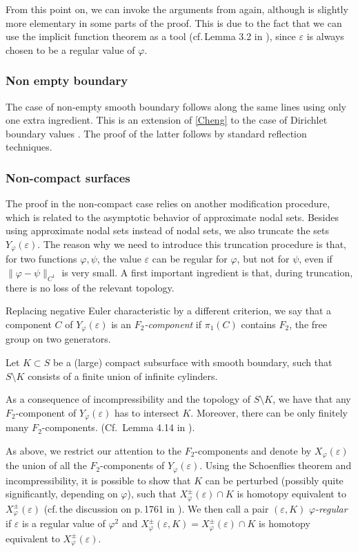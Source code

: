 \documentclass[a4paper,11pt]{amsart}
\numberwithin{equation}{section}
\theoremstyle{definition}
\def\ve{\varepsilon}
\begin{document}
From this point on, we can invoke the arguments from \cite{OR} again, although \cite{BMM1} is slightly more elementary in some parts of the proof.
This is due to the fact that we can use the implicit function theorem as a tool (cf.\,Lemma 3.2 in \cite{BMM1}), since $\ve$ is always chosen to be a regular value of $\varphi$. 

\subsubsection{Non empty boundary}
The case of non-empty smooth boundary follows along the same lines using only one extra ingredient.
This is an extension of \cref{Cheng} to the case of Dirichlet boundary values \cite[Theorem 1.7]{BMM2}.
The proof of the latter follows by standard reflection techniques.

\subsubsection{Non-compact surfaces}
The proof in the non-compact case relies on another modification procedure, which is related to the asymptotic behavior of approximate nodal sets.
Besides using approximate nodal sets instead of nodal sets, we also truncate the sets $Y_\varphi(\ve)$.
The reason why we need to introduce this truncation procedure is that, for two functions  $\varphi,\psi$, the value $\ve$ can be regular for $\varphi$, but not for $\psi$, even if $\| \varphi - \psi\|_{C^1}$ is very small.
A first important ingredient is that, during truncation, there is no loss of the relevant topology.

Replacing negative Euler characteristic by a different criterion,
we say that a component $C$ of $Y_\varphi(\ve)$ is an \emph{$F_2$-component}
if $\pi_1(C)$ contains $F_2$, the free group on two generators.

Let $K \subset S$ be a (large) compact subsurface with smooth boundary, such that $S \setminus K$ consists of a finite union of infinite cylinders.

As a consequence of incompressibility and the topology of $S \setminus K$, we have that any $F_2$-component of $Y_\varphi(\ve)$ has to intersect $K$.
Moreover, there can be only finitely many $F_2$-components.
(Cf.\ Lemma 4.14 in \cite{BMM2}).

As above, we restrict our attention to the $F_2$-components and denote by
$X_\varphi(\ve)$ the union of all the $F_2$-components of $Y_\varphi(\ve)$.
Using the Schoenflies theorem and incompressibility, it is possible to show that $K$ can be perturbed (possibly quite significantly, depending on $\varphi$),
such that $X_\varphi^{\pm}(\ve) \cap K$ is homotopy equivalent to $X_\varphi^{\pm}(\ve)$ (cf.\,the discussion on p.\,1761 in \cite{BMM2}).
We then call a pair $(\ve,K)$ \emph{$\varphi$-regular} if $\ve$ is a regular value of $\varphi^2$ and $X_\varphi^{\pm}(\ve,K)=X_\varphi^{\pm}(\ve)\cap K$ is homotopy equivalent to $X_\varphi^{\pm}(\ve)$.
\end{document}
